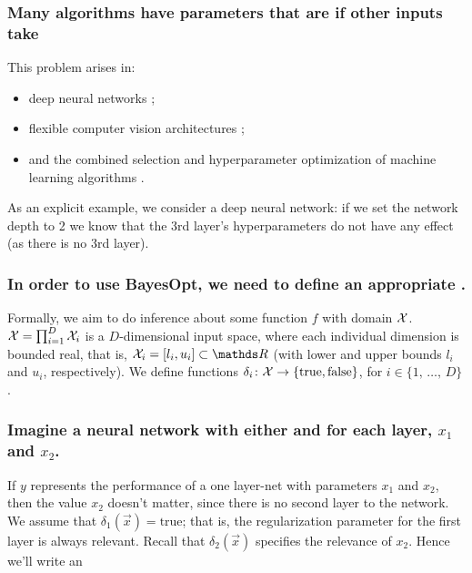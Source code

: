 \documentclass[12pt,onlymath]{beamer}
\begin{document}
\begin{frame}\frametitle{Many algorithms have parameters that are  if other inputs take }
This problem arises in:
\begin{itemize}
	\item  deep neural networks \citep{HinOsiTeh06}; 
	\item  flexible computer vision architectures \citep{BerYamCox13}; 
	\item and the combined selection and hyperparameter optimization of machine learning algorithms \citep{ThoEtAl13}.
\end{itemize}
As an explicit example, we consider a deep neural network: if we set the network depth to 2 we know that the 3rd layer's hyperparameters do not have any effect (as there is no 3rd layer).
\end{frame}

\begin{frame}\frametitle{In order to use BayesOpt, we need to define an appropriate .
}

Formally, we aim to do inference about some function $f$ with domain 
 $\mathcal{X}$. 
\vfill
 $\mathcal{X} = \prod_{i=1}^D \mathcal{X}_i$ is a $D$-dimensional input space, where each individual dimension is bounded real, that is, $\sX_i = [l_i, u_i] \subset \reals$ (with lower and upper bounds $l_i$ and $u_i$, respectively).
 \vfill
We define functions 
$\delta_i\colon \mathcal{X}\to \{\textnormal{true}, \textnormal{false}\}$,
 for $i \in \{1,\,\ldots,\,D\}$.

\end{frame}





\begin{frame}\frametitle{Imagine a neural network with either  and  for each layer, $x_1$ and $x_2$.}

If $y$ represents the performance of a one layer-net with parameters $x_1$ and $x_2$, then the value $x_2$ doesn't matter, since there is no second layer to the network.
\vfill
We assume that $\delta_1(\vec{x}) = \text{true}$; that is, the regularization parameter for the first layer is always relevant.
\vfill
Recall that $\delta_2(\vec{x})$ specifies the relevance of $x_2$. 
\vfill
Hence we'll write an 

\end{frame}
\end{document}
